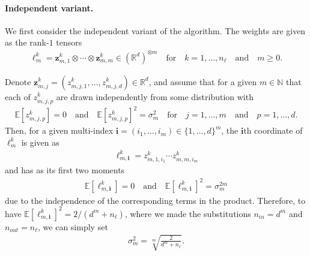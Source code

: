 \documentclass{article} \usepackage{iclr2021_conference,times}
\newcommand{\R}{\mathbb{R}}
\newcommand{\bz}{\mathbf{z}}
\newcommand{\NN}{\mathbb{N}}
\newcommand{\EE}{\mathbb{E}}
\theoremstyle{plain}
\theoremstyle{definition}
\begin{document}
\paragraph{Independent variant.} We first consider the independent variant of the algorithm. The weights are given as the rank-$1$ tensors 
\begin{align}
    \ell^k_m = \bz_{m, 1}^k \otimes \cdots \otimes \bz_{m, m}^k \in (\R^d)^{\otimes m} \quad\text{for}\quad k = 1, \dots, n_\ell\quad\text{and}\quad m \geq 0.
\end{align}

Denote $\bz^k_{m, j} = (z^k_{m, j, 1}, \dots, z^k_{m, j, d}) \in \R^d$, and assume that for a given $m \in \NN$ that each of $z^k_{m, j, p}$ are drawn independently from some distribution with
\begin{align}
    \EE[z^k_{m, j, p}] = 0 \quad\text{and}\quad \EE[z^k_{m, j, p}]^2 = \sigma_m^2 \quad\text{for}\quad j=1, \dots, m \quad\text{and}\quad p=1, \dots, d.
\end{align}
Then, for a given multi-index $\mathbf{i} = (i_1, \dots, i_m) \in \{1, \dots, d\}^m$, the $\mathbf{i}\text{th}$ coordinate of $\ell^k_m$ is given as
\begin{align}
    \ell^k_{m, \mathbf{i}} = z^k_{m, 1, i_1} \cdots z^k_{m, m, i_m}    
\end{align}
and has as its first two moments
\begin{align}
    \EE[\ell^k_{m, \mathbf{i}}] = 0\quad\text{and}\quad\EE[\ell^k_{m, \mathbf{i}}]^2 = \sigma_m^{2m}
\end{align}
due to the independence of the corresponding terms in the product. Therefore, to have $\EE[\ell^k_{m, \mathbf{i}}]^2 = 2 / (d^m + n_\ell)$, where we made the substitutions $n_{in} = d^m$ and $n_{out} = n_\ell$, we can simply set
\begin{align}
    \sigma_m^2 = \sqrt[m]{\frac{2}{d^m + n_\ell}}.    
\end{align}
\end{document}
